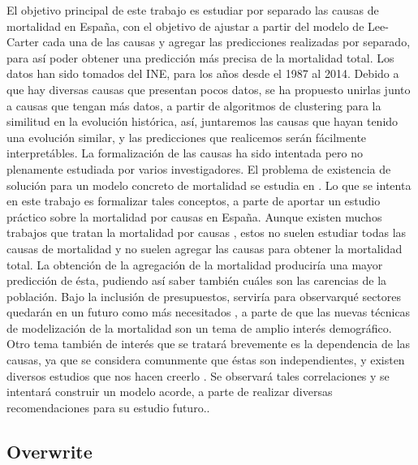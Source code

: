 \documentclass{article}
\begin{document}
El objetivo principal de este trabajo es estudiar por separado las causas de mortalidad en España, con el objetivo de ajustar a partir del modelo de Lee-Carter cada una de las causas y agregar las predicciones realizadas por separado, para así poder obtener una predicción más precisa de la mortalidad total.
Los datos han sido tomados del INE, para los años desde el 1987 al 2014.
\newline
Debido a que hay diversas causas que presentan pocos datos, se ha propuesto unirlas junto a causas que tengan más datos, a partir de algoritmos de clustering para la similitud en la evolución histórica, así, juntaremos las causas que hayan tenido una evolución similar, y las predicciones que realicemos serán fácilmente interpretábles.
\newline
La formalización de las causas ha sido intentada pero no plenamente estudiada por varios investigadores. El problema de existencia de solución para un modelo concreto de mortalidad se estudia en \cite{morillas2014nonlocal}. Lo que se intenta en este trabajo es formalizar tales conceptos, a parte de aportar un estudio práctico sobre la mortalidad por causas en España. Aunque existen muchos trabajos que tratan la mortalidad por causas \cite{gonzalez2014que}, estos no suelen estudiar todas las causas de mortalidad y no suelen agregar las causas para obtener la mortalidad total. La obtención de la agregación de la mortalidad produciría una mayor predicción de ésta, pudiendo así saber también cuáles son las carencias de la población. Bajo la inclusión de presupuestos, serviría para observarqué sectores quedarán en un futuro como más necesitados \cite{ridsdale2010mortality}, a parte de que las nuevas técnicas de modelización de la mortalidad son un tema de amplio interés demográfico.
\newline
Otro tema también de interés que se tratará brevemente es la dependencia de las causas, ya que se considera comunmente que éstas son independientes, y existen diversos estudios que nos hacen creerlo \cite{alai2015modelling}\cite{arnold2015causes}\cite{gaille2012causes}. Se observará tales correlaciones y se intentará construir un modelo acorde, a parte de realizar diversas recomendaciones para su estudio futuro..

\subsection*{Overwrite}
\end{document}
